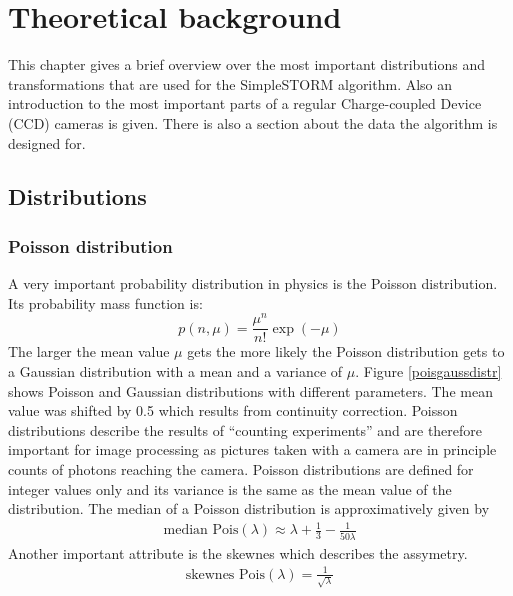 \chapter{Theoretical background}
This chapter gives a brief overview over the most important distributions and transformations that are used for the SimpleSTORM algorithm. Also an introduction to the most important parts of a regular Charge-coupled Device (CCD) cameras is given. There is also a section about the data the algorithm is designed for.
\section{Distributions}
\subsection{Poisson distribution}
A very important probability distribution in physics is the Poisson
distribution. Its probability mass function is:
\begin{equation}
	p(n,\mu) = \frac{\mu^n}{n!}\exp(-\mu)
\end{equation}
The larger the mean value $\mu$ gets the more likely the Poisson distribution gets to a Gaussian distribution with a mean and a variance of $\mu$. Figure \ref{poisgaussdistr} shows Poisson and Gaussian distributions with different parameters. The mean value was shifted by 0.5 which results from continuity correction.\newline
Poisson distributions describe the results of ``counting experiments'' and are
therefore important for image processing as pictures taken with a
camera are in principle counts of photons reaching the camera.  \newline
Poisson distributions are defined for integer values only and its variance is
the same as the mean value of the distribution.\newline
The median of a Poisson distribution is approximatively given by
\begin{align}
	\text{median Pois}(\lambda) \approx \lambda + \frac{1}{3} - \frac{1}{50\lambda} \label{meanMedianPoiss}
\end{align}
Another important attribute is
the skewnes which describes the assymetry.
\begin{align}
 \text{skewnes Pois}(\lambda) = \frac{1}{\sqrt{\lambda}}
\end{align}

